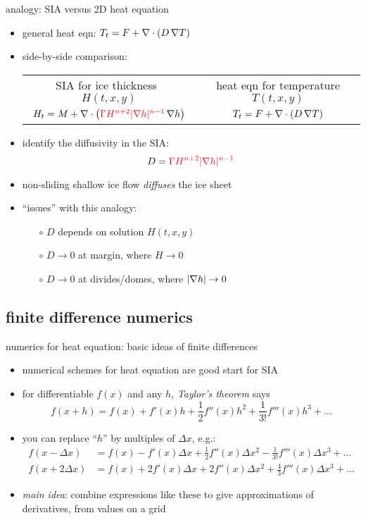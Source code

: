 \begin{frame}{analogy: SIA versus 2D heat equation}

\begin{itemize}
\item general heat eqn: $T_t = F + \nabla\cdot (D\, \nabla T)$
\item side-by-side comparison:

\medskip
\begin{tabular}{cc}
\scriptsize SIA for ice thickness \, $H(t,x,y)$ & \scriptsize heat eqn for temperature $T(t,x,y)$ \normalsize \medskip \\
	\hspace{-6mm} $H_t = M + \nabla\cdot \left({\color{red}\Gamma H^{n+2} |\nabla h|^{n-1}}\, \nabla h \right)$  &  $T_t = F + \nabla\cdot (D\, \nabla T)$
\end{tabular} 

\medskip
\item identify the diffusivity in the SIA:
	$$D = {\color{red}\Gamma H^{n+2} |\nabla h|^{n-1}}$$
\item non-sliding shallow ice flow \emph{diffuses} the ice sheet
\item ``issues'' with this analogy:
  \begin{itemize}
  \item[$\circ$]  $D$ depends on solution $H(t,x,y)$
  \item[$\circ$]  $D\to 0$ at margin, where $H\to 0$
  \item[$\circ$]  $D\to 0$ at divides/domes, where $|\nabla h|\to 0$
  \end{itemize}
\end{itemize}
\end{frame}


\subsection{finite difference numerics}

\begin{frame}{numerics for heat equation: basic ideas of finite differences}

\begin{itemize}
\item numerical schemes for heat equation are good start for SIA
\item for differentiable $f(x)$ and any $h$, \emph{Taylor's theorem} says
	$$f(x+h) = f(x) + f'(x) h + \frac{1}{2} f''(x) h^2 + \frac{1}{3!} f'''(x) h^3 + \dots$$
\normalsize
\item you can replace ``$h$'' by multiples of $\Delta x$, e.g.:
\small
\begin{align*}
f(x-\Delta x) &= f(x) - f'(x) \Delta x + \frac{1}{2} f''(x) \Delta x^2 - \frac{1}{3!} f'''(x) \Delta x^3 + \dots \\
f(x+2\Delta x) &= f(x) + 2 f'(x) \Delta x + 2 f''(x) \Delta x^2 + \frac{4}{3} f'''(x) \Delta x^3 + \dots
\end{align*}
\normalsize
\item \emph{main idea}:  combine expressions like these to give approximations of derivatives, from values on a grid
\end{itemize}
\end{frame}


